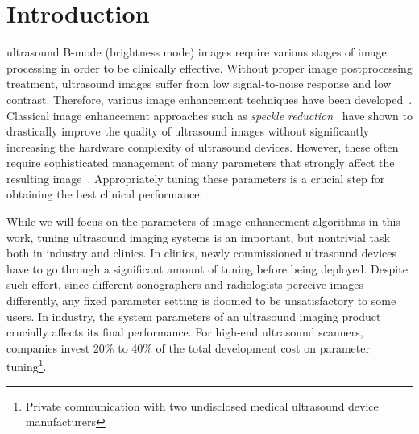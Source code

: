 
\section{Introduction}\label{section:introduction}
 ultrasound B-mode (brightness mode) images require various stages of image processing in order to be clinically effective.
Without proper image postprocessing treatment, ultrasound images suffer from low signal-to-noise response and low contrast.
Therefore, various image enhancement techniques have been developed~\cite{contrerasortiz_ultrasound_2012}.
%
Classical image enhancement approaches such as \textit{speckle reduction}~\cite{finn_echocardiographic_2011, duarte-salazar_speckle_2020} have shown to drastically improve the quality of ultrasound images without significantly increasing the hardware complexity of ultrasound devices. 
However, these often require sophisticated management of many parameters that strongly affect the resulting image~\cite{duarte-salazar_speckle_2020}.
Appropriately tuning these parameters is a crucial step for obtaining the best clinical performance.%

While we will focus on the parameters of image enhancement algorithms in this work, tuning ultrasound imaging systems is an important, but nontrivial task both in industry and clinics.
In clinics, newly commissioned ultrasound devices have to go through a significant amount of tuning before being deployed.
Despite such effort, since different sonographers and radiologists perceive images differently, any fixed parameter setting is doomed to be unsatisfactory to some users.
In industry, the system parameters of an ultrasound imaging product crucially affects its final performance.
For high-end ultrasound scanners, companies invest 20\% to 40\% of the total development cost on parameter tuning\footnote{Private communication with two undisclosed medical ultrasound device manufacturers}.

